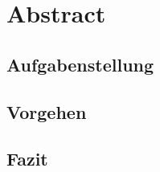 \section{Abstract} 

\subsection{Aufgabenstellung} \label{Abstract}

\subsection{Vorgehen}

\subsection{Fazit}
